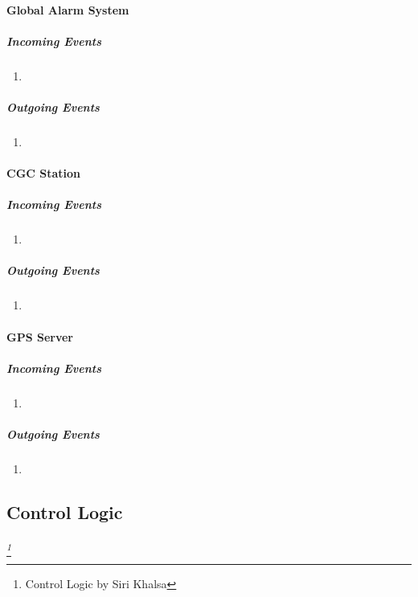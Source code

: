 \documentclass[12pt]{article}
\begin{document}
		\paragraph{Global Alarm System}
		\textit{}
			\subparagraph{Incoming Events}
				\begin{enumerate}
					\item 
				\end{enumerate}
				
			\subparagraph{Outgoing Events}
				\begin{enumerate}
					\item 
				\end{enumerate}

		\paragraph{CGC Station}
		\textit{}
			\subparagraph{Incoming Events}
				\begin{enumerate}
					\item 
				\end{enumerate}
				
			\subparagraph{Outgoing Events}
				\begin{enumerate}
					\item 
				\end{enumerate}

		\paragraph{GPS Server}
		\textit{}
			\subparagraph{Incoming Events}
				\begin{enumerate}
					\item 
				\end{enumerate}
				
			\subparagraph{Outgoing Events}
				\begin{enumerate}
					\item 
				\end{enumerate}
				
		
		
		\subsection{Control Logic} \label{logic}%
		\paragraph{} \textit{ \footnote{Control Logic by Siri Khalsa}}
\end{document}
